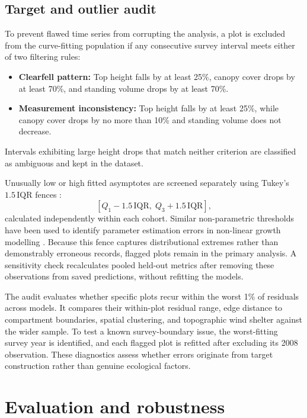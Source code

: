 \documentclass[logo,msc,ai]{infthesis}           %
\begin{document}
\subsection*{Target and outlier audit}
To prevent flawed time series from corrupting the analysis, a plot is excluded from the curve-fitting population if any consecutive survey interval meets either of two filtering rules:
\begin{itemize}
\setlength\itemsep{2pt}
\item \textbf{Clearfell pattern:} Top height falls by at least 25\%, canopy cover drops by at least 70\%, and standing volume drops by at least 70\%.
\item \textbf{Measurement inconsistency:} Top height falls by at least 25\%, while canopy cover drops by no more than 10\% and standing volume does not decrease.
\end{itemize}
Intervals exhibiting large height drops that match neither criterion are classified as ambiguous and kept in the dataset.

Unusually low or high fitted asymptotes are screened separately using Tukey's $1.5\,\mathrm{IQR}$ fences \cite{tukey1977Exploratory}:
\begin{equation}
\left[Q_1 - 1.5\,\mathrm{IQR},\; Q_3 + 1.5\,\mathrm{IQR}\right],
\label{eq:tukey-fences}
\end{equation}
calculated independently within each cohort. Similar non-parametric thresholds have been used to identify parameter estimation errors in non-linear growth modelling \cite{markovic2014NewApproach}. Because this fence captures distributional extremes rather than demonstrably erroneous records, flagged plots remain in the primary analysis. A sensitivity check recalculates pooled held-out metrics after removing these observations from saved predictions, without refitting the models.

The audit evaluates whether specific plots recur within the worst 1\% of residuals across models. It compares their within-plot residual range, edge distance to compartment boundaries, spatial clustering, and topographic wind shelter against the wider sample. To test a known survey-boundary issue, the worst-fitting survey year is identified, and each flagged plot is refitted after excluding its 2008 observation. These diagnostics assess whether errors originate from target construction rather than genuine ecological factors.

\section{Evaluation and robustness}
\end{document}
